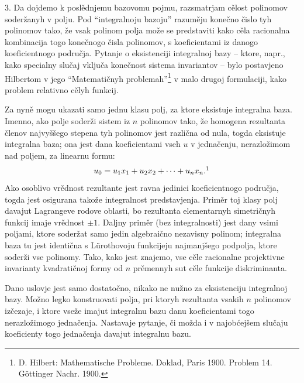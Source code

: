 \documentclass[11pt]{article}
\begin{document}
3. Da dojdemo k poslědnjemu bazovomu pojmu, razsmatrjam cělost polinomov soderžanyh v polju. Pod ``integralnoju bazoju'' razuměju konečno čislo tyh polinomov tako, že vsak polinom polja može se predstaviti kako cěla racionalna kombinacija togo konečnogo čisla polinomov, s koeficientami iz danogo koeficientnogo područja. Pytanje o eksistenciji integralnoj bazy -- ktore, napr., kako specialny slučaj vključa konečnost sistema invariantov -- bylo postavjeno Hilbertom v jego ``Matematičnyh problemah''\footnote{D. Hilbert: Mathematische Probleme. Doklad, Paris 1900. Problem 14. Göttinger Nachr. 1900.} v malo drugoj formulaciji, kako problem relativno cělyh funkcij.

Za nyně mogu ukazati samo jednu klasu polj, za ktore eksistuje integralna baza. Imenno, ako polje soderži sistem iz $n$ polinomov tako, že homogena rezultanta členov najvyššego stepena tyh polinomov jest različna od nula, togda eksistuje integralna baza; ona jest dana koeficientami vseh $u$ v jednačenju, nerazložimom nad poljem, za linearnu formu:
\[
  u_0=u_1x_1+u_2x_2+\cdots+u_nx_n.\footnotemark
\]
Ako osoblivo vrědnost rezultante jest ravna jedinici koeficientnogo područja, togda jest osigurana takože integralnost predstavjenja. Priměr toj klasy polj davajut Lagrangeve rodove oblasti, bo rezultanta elementarnyh simetričnyh funkcij imaje vrědnost $\pm 1$. Daljny priměr (bez integralnosti) jest dany vsimi poljami, ktore soderžat samo jedin algebraično nezavisny polinom; integralna baza tu jest identična s Lürothovoju funkcijeju najmanjšego podpolja, ktore soderži vse polinomy. Tako, kako jest znajemo, vse cěle racionalne projektivne invarianty kvadratičnoj formy od $n$ prěmennyh sut cěle funkcije diskriminanta.

Dano uslovje jest samo dostatočno, nikako ne nužno za eksistenciju integralnoj bazy. Možno legko konstruovati polja, pri ktoryh rezultanta vsakih $n$ polinomov izčezaje, i ktore vseže imajut integralnu bazu danu koeficientami togo nerazložimogo jednačenja. Nastavaje pytanje, či možda i v najobćejšem slučaju koeficienty togo jednačenja davajut integralnu bazu.
\end{document}
